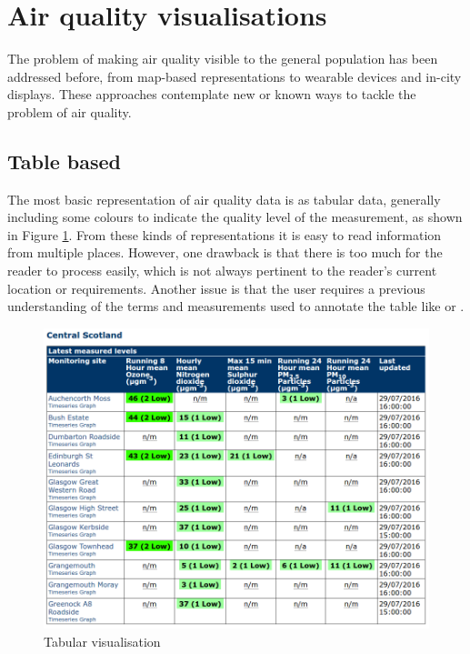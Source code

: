 \section{Air quality visualisations}
The problem of making air quality visible to the general population has been addressed before, from map-based representations to wearable devices and in-city displays. These approaches contemplate new or known ways to tackle the problem of air quality.

\subsection{Table based}
The most basic representation of air quality data is as tabular data, generally including some colours to indicate the quality level of the measurement, as shown in Figure \ref{fig:table_based_visualization}. From these kinds of representations it is easy to read information from multiple places. However, one drawback is that there is too much for the reader to process easily, which is not always pertinent to the reader's current location or requirements. Another issue is that the user requires a previous understanding of the terms and measurements used to annotate the table like  or . 

\begin{figure}[H]
\begin{adjustbox}{width=1\textwidth,center=\textwidth}
  \centering
  \includegraphics[scale=1]{images/tabular_data.png}
\end{adjustbox}
  \caption[Tabular visualisation]{Tabular visualisation \cite{DepartmentforEnvironment}}
  \label{fig:table_based_visualization}
\end{figure}

